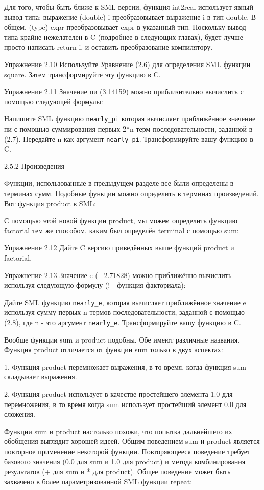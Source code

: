 Для того, чтобы быть ближе к SML версии, функция int2real использует явный вывод типа: выражение (double) i преобразовывает выражение i в тип double. В общем, (type) expr преобразовывает expr в указанный тип. Поскольку вывод типа крайне нежелателен в C (подробнее в следующих главах), будет лучше просто написать return i, и оставить преобразование компилятору.

Упражнение 2.10 Используйте Уравнение (2.6) для определения SML функции square. Затем трансформируйте эту функцию в C.

Упражнение 2.11 Значение пи (3.14159) можно приблизительно вычислить с помощью следующей формулы:

Напишите SML функцию \lstinline|nearly_pi| которая вычисляет приближённое значение пи с помощью суммирования первых 2*n терм последовательности, заданной в (2.7). Передайте n как аргумент \lstinline|nearly_pi|. Трансформируйте вашу функцию в C.

2.5.2 Произведения

Функции, использованные в предыдущем разделе все были определены в терминах сумм. Подобные функции можно определить в терминах произведений. Вот функция product в SML:

С помощью этой новой функции product, мы можем определить функцию factorial тем же способом, каким был определён terminal с помощью sum:

Упражнение 2.12 Дайте C версию приведённых выше функций product и factorial.

Упражнение 2.13 Значение e (~ 2.71828) можно приближённо вычислить используя следующую формулу (! - функция факториала):

Дайте SML функцию \lstinline|nearly_e|, которая вычисляет приближённое значение e используя сумму первых n термов последовательности, заданной с помощью (2.8), где n - это аргумент \lstinline|nearly_e|. Трансформируйте вашу функцию в C.

Вообще функции sum и product подобны. Обе имеют различные названия. Функция product отличается от функции sum только в двух аспектах:

1. Функция product перемножает выражения, в то время, когда функция sum складывает выражения.

2. Функция product использует в качестве простейшего элемента 1.0 для перемножения, в то время когда sum использует простейший элемент 0.0 для сложения.

Функции sum и product настолько похожи, что попытка дальнейшего их обобщения выглядит хорошей идеей. Общим поведением sum и product является повторное применение некоторой функции. Повторяющееся поведение требует базового значения (0.0 для sum и 1.0 для product) и метода комбинирования результатов (+ для sum и * для product). Общее поведение может быть захвачено в более параметризованной SML функции repeat:

